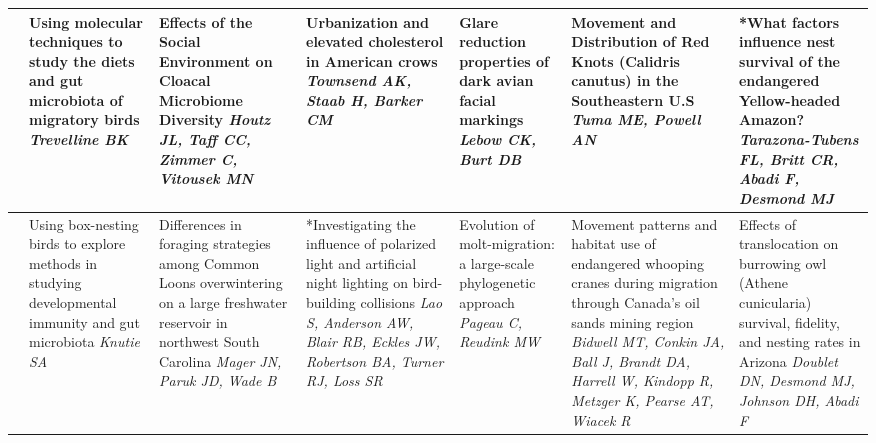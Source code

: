 \begin{tabular}{|x{0.75cm}|a{2.25cm}|x{2.25cm}|x{2.25cm}|x{2.25cm}|x{2.25cm}|x{2.25cm}|}
&Using molecular techniques to study the diets and gut microbiota of migratory birds \newline \newline \textit{Trevelline BK} & Effects of the Social Environment on Cloacal Microbiome Diversity \newline \newline \textit{Houtz JL, Taff CC, Zimmer C, Vitousek MN} & Urbanization and elevated cholesterol in American crows \newline \newline \textit{Townsend AK, Staab H, Barker CM} & Glare reduction properties of dark avian facial markings \newline \newline \textit{Lebow CK, Burt DB} & Movement and Distribution of Red Knots (Calidris canutus) in the Southeastern U.S \newline \newline \textit{Tuma ME, Powell AN} & *What factors influence nest survival of the endangered Yellow-headed Amazon? \newline \newline \textit{Tarazona-Tubens FL, Britt CR, Abadi F, Desmond MJ}\\
\hline
{}&Using box-nesting birds to explore methods in studying developmental immunity and gut microbiota \newline \newline \textit{Knutie SA} & Differences in foraging strategies among Common Loons overwintering on a large freshwater reservoir in northwest South Carolina \newline \newline \textit{Mager JN, Paruk JD, Wade B} & *Investigating the influence of polarized light and artificial night lighting on bird-building collisions \newline \newline \textit{Lao S, Anderson AW, Blair RB, Eckles JW, Robertson BA, Turner RJ, Loss SR} & Evolution of molt-migration: a large-scale phylogenetic approach \newline \newline \textit{Pageau C, Reudink MW} & Movement patterns and habitat use of endangered whooping cranes during migration through Canada’s oil sands mining region \newline \newline \textit{Bidwell MT, Conkin JA, Ball J, Brandt DA, Harrell W, Kindopp R, Metzger K, Pearse AT, Wiacek R} & Effects of translocation on burrowing owl (Athene cunicularia) survival, fidelity, and nesting rates in Arizona \newline \newline \textit{Doublet DN, Desmond MJ, Johnson DH, Abadi F}\\

\end{tabular}
